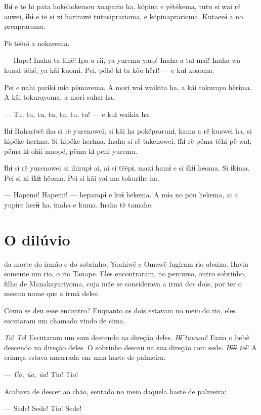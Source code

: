 Ɨhɨ e te hi pata hokëhokëmou xoapario ha, kõpina e yëtëkema, tutu si wai
rë auwei, ɨ̃hɨ e të si xi harirawë tutusiprarioma, e kõpinaprarioma.
Kutaenɨ a no preapraroma. 

Pë tëënɨ a nokarema. 

--- Hape! Ɨnaha ta tihë! Ipa a rii, ya yurema yaro! Ɨnaha a taɨ mai! Ɨnaha
wa kuaaɨ tëhë, ya kãi kuomi. Pei, pëhë kɨ ta kõo hërɨ! --- e kuɨ
xoaoma. 

Pei e nahi parɨkɨ mɨa pëmarema. A mori waɨ waikita ha, a kãi tokurayo
hërɨma. A kãi tokurayoma, a mori suhaɨ ha. 

--- Tu, tu, tu, tu, tu, tu, tu! --- e kuɨ waikia ha. 

Ɨhɨ Rahariwë iha si rë yurenowei, si kãi ha pokëprarunɨ, kama a rë
kuawei ha, si hipëke herɨma. Si hipëke herɨma. Ɨnaha si rë takenowei,
ɨ̃hɨ rë pëma tẽhi pë waɨ, pëma kɨ ohii maopë, pëma kɨ pehi yurema. 

Ɨhɨ si rë yurenowei ai ihirupɨ ai, ai si tëëpɨ, maxi hamɨ e si ɨ̃kɨɨ
hëoma. Si ɨ̃kɨma. Pei si xi ɨ̃kɨɨ hëoma. Pei si kãi yai ma tokurɨhe ha. 

--- Hapemi! Hapemi! --- heparapɨ e kuɨ hëkema. A mɨa no pou hëkema, ai a
yupɨre herɨɨ ha, ɨnaha e kuma. Ɨnaha të tamahe. 

\chapter[O dilúvio]{O dilúvio}

 da morte do irmão e do sobrinho, Yoahiwë e Omawë fugiram rio
abaixo. Havia somente um rio, o rio Tanape. Eles encontraram, no
percurso, outro sobrinho, filho de Manakayariyoma, cuja mãe se
considerava a irmã dos dois, por ter o mesmo nome que a irmã deles. 

Como se deu esse encontro? Enquanto os dois estavam no meio do rio, eles
escutaram um chamado vindo de cima. 

\textit{To}! \textit{To}! Escutaram um som descendo na direção deles. \textit{Hɨ̃ tuuuuu}! Fazia o
bebê descendo na direção deles. O sobrinho desceu na sua direção com
sede. \textit{Hɨ̃ɨɨ tëɨ}! A criança estava amarrada em uma haste de palmeira.

--- \textit{Ũa, ũa, ũa}! Tio! Tio!

Acabava de descer ao chão, sentado no meio daquela haste de palmeira:

--- Sede! Sede! Tio! Sede!

